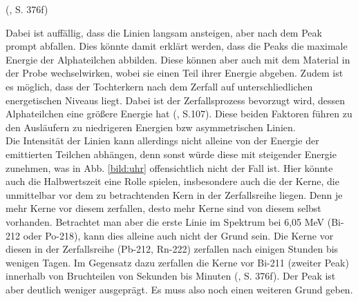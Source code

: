 (\cite{Mende2016}, S. 376f)

Dabei ist auffällig, dass die Linien langsam ansteigen, aber nach dem Peak prompt abfallen. Dies könnte damit erklärt werden, dass 
die Peaks die maximale Energie der Alphateilchen abbilden. Diese können aber auch mit dem Material in der Probe wechselwirken, wobei 
sie einen Teil ihrer Energie abgeben. Zudem ist es 
möglich, dass der Tochterkern nach dem Zerfall auf unterschliedlichen energetischen Niveaus liegt. Dabei ist der Zerfallsprozess 
bevorzugt wird, dessen Alphateilchen eine größere Energie hat (\cite{Marmier1977}, S.107). Diese beiden Faktoren führen zu den Ausläufern 
zu niedrigeren Energien bzw asymmetrischen Linien. \\

Die Intensität der Linien kann allerdings nicht alleine von der Energie der emittierten Teilchen abhängen, denn sonst würde diese mit 
steigender Energie zunehmen, was in Abb. \ref{bild:uhr} offensichtlich nicht der Fall ist. Hier könnte auch die Halbwertszeit eine Rolle 
spielen, insbesondere auch die der Kerne, die unmittelbar vor dem zu betrachtenden Kern in der Zerfallsreihe liegen. Denn je mehr Kerne 
vor diesem zerfallen, desto mehr Kerne sind von diesem selbst vorhanden. Betrachtet man aber die erste Linie im Spektrum bei 6,05 MeV 
(Bi-212 oder Po-218), kann dies alleine auch nicht der Grund sein. Die Kerne vor diesen in der Zerfallsreihe (Pb-212, Rn-222) 
zerfallen nach einigen Stunden bis wenigen Tagen. Im Gegensatz dazu zerfallen die Kerne vor Bi-211 (zweiter Peak) innerhalb von 
Bruchteilen von Sekunden bis Minuten (\cite{Mende2016}, S. 376f). Der Peak ist aber deutlich weniger ausgeprägt. Es muss also noch einen 
weiteren Grund geben.



